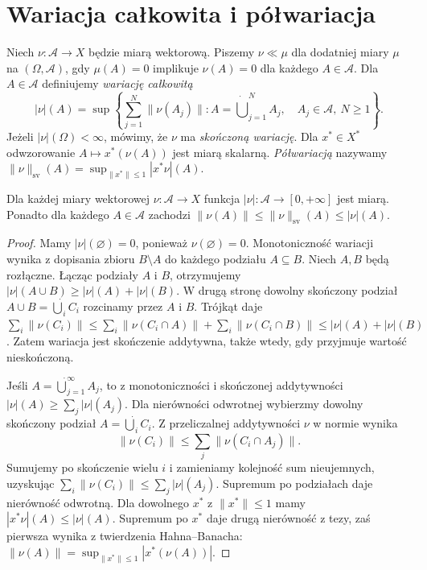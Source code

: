 \section{Wariacja całkowita i półwariacja}
\label{sec:vector-variation-30}
\begin{definicja}
\label{def:vector-variation-30}
Niech $\nu:\mathcal A\to X$ będzie miarą wektorową.
Piszemy $\nu\ll\mu$ dla dodatniej miary $\mu$
na $(\Omega,\mathcal A)$, gdy $\mu(A)=0$ implikuje
$\nu(A)=0$ dla każdego $A\in\mathcal A$.
Dla $A\in\mathcal A$ definiujemy \emph{wariację całkowitą}
\[
 |\nu|(A)=\sup\left\{\sum_{j=1}^{N}\|\nu(A_j)\|:
 A=\dot\bigcup_{j=1}^{N}A_j,\quad A_j\in\mathcal A,\ N\ge1\right\}.
\]
Jeżeli $|\nu|(\Omega)<\infty$, mówimy, że $\nu$ ma
\emph{skończoną wariację}. Dla $x^*\in X^*$ odwzorowanie
$A\mapsto x^*(\nu(A))$ jest miarą skalarną.
\emph{Półwariacją} nazywamy
$\|\nu\|_{\mathrm{sv}}(A)
=\sup_{\|x^*\|\le1}|x^*\nu|(A)$.
\end{definicja}

\begin{twierdzenie}
\label{thm:vector-variation-measure-30}
Dla każdej miary wektorowej $\nu:\mathcal A\to X$
funkcja $|\nu|:\mathcal A\to[0,+\infty]$ jest miarą.
Ponadto dla każdego $A\in\mathcal A$ zachodzi
$\|\nu(A)\|\le\|\nu\|_{\mathrm{sv}}(A)\le|\nu|(A)$.
\end{twierdzenie}
\begin{proof}
Mamy $|\nu|(\varnothing)=0$, ponieważ
$\nu(\varnothing)=0$. Monotoniczność wariacji wynika z dopisania zbioru
$B\setminus A$ do każdego podziału $A\subseteq B$.
Niech $A,B$ będą rozłączne. Łącząc podziały $A$ i $B$,
otrzymujemy $|\nu|(A\cup B)\ge|\nu|(A)+|\nu|(B)$.
W drugą stronę dowolny skończony podział
$A\cup B=\dot\bigcup_i C_i$ rozcinamy przez $A$ i $B$.
Trójkąt daje
$\sum_i\|\nu(C_i)\|
\le\sum_i\|\nu(C_i\cap A)\|+\sum_i\|\nu(C_i\cap B)\|
\le|\nu|(A)+|\nu|(B)$.
Zatem wariacja jest skończenie addytywna, także wtedy,
gdy przyjmuje wartość nieskończoną.

Jeśli $A=\dot\bigcup_{j=1}^{\infty}A_j$,
to z monotoniczności i skończonej addytywności
$|\nu|(A)\ge\sum_j|\nu|(A_j)$.
Dla nierówności odwrotnej wybierzmy dowolny
skończony podział $A=\dot\bigcup_i C_i$.
Z przeliczalnej addytywności $\nu$ w normie wynika
\[
 \|\nu(C_i)\|\le\sum_j\|\nu(C_i\cap A_j)\|.
\]
Sumujemy po skończenie wielu $i$ i zamieniamy kolejność
sum nieujemnych, uzyskując
$\sum_i\|\nu(C_i)\|\le\sum_j|\nu|(A_j)$.
Supremum po podziałach daje nierówność odwrotną.
Dla dowolnego $x^*$ z $\|x^*\|\le1$ mamy
$|x^*\nu|(A)\le|\nu|(A)$. Supremum po $x^*$
daje drugą nierówność z tezy, zaś pierwsza wynika
z twierdzenia Hahna--Banacha:
$\|\nu(A)\|=\sup_{\|x^*\|\le1}|x^*(\nu(A))|$.
\end{proof}

